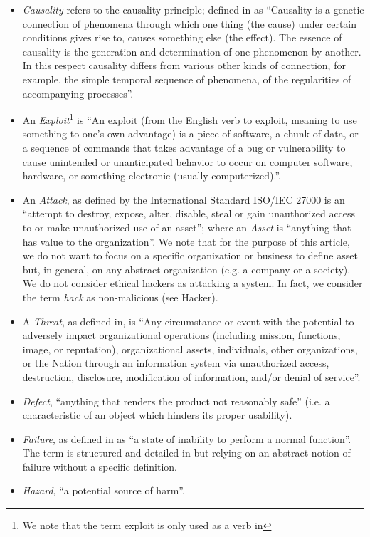 \begin{itemize}
	\item \emph{Causality} refers to the causality principle; defined
		in\autocite{Spirkin1983Dialectical} as ``Causality is a genetic
		connection of phenomena through which one thing (the cause)
		under certain conditions gives rise to, causes something else
		(the effect). The essence of causality is the generation and
		determination of one phenomenon by another. In this respect
		causality differs from various other kinds of connection, for
		example, the simple temporal sequence of phenomena, of the
		regularities of accompanying processes''.
	\item An \emph{Exploit}\footnote{We note that the term exploit is only
		used as a verb in\autocite{ISO2009information}} is ``An exploit
		(from the English verb to exploit, meaning to use something to
		one’s own advantage) is a piece of software, a chunk of data,
		or a sequence of commands that takes advantage of a bug or
		vulnerability to cause unintended or unanticipated behavior to
		occur on computer software, hardware, or something electronic
		(usually computerized).''\autocite{wiki-exploit}.
	\item An \emph{Attack}, as defined by the International Standard
		ISO/IEC 27000 is an ``attempt to destroy, expose, alter,
		disable, steal or gain unauthorized access to or make
		unauthorized use of an asset''; where an \emph{Asset} is
		``anything that has value to the organization''. We note that for
		the purpose of this article, we do not want to focus on a specific
		organization or business to define asset but, in general, on any 
		abstract organization (e.g. a company or a society).
		We do not consider ethical hackers as attacking a system. 
		In fact, we consider the term \emph{hack} as
		non-malicious (see Hacker\autocite{Stallman2002hacker}).
	\item A \emph{Threat}, as defined in\autocite{cnssi20104009}, is ``Any
		circumstance or event with the potential to adversely impact
		organizational operations (including mission, functions, image,
		or reputation), organizational assets, individuals, other
		organizations, or the Nation through an information system via
		unauthorized access, destruction, disclosure, modification of
		information, and/or denial of service''.
	\item \emph{Defect}, ``anything that renders the product not reasonably
		safe''\autocite{Robinson2019writing} (i.e. a characteristic of
		an object which hinders its proper usability).
	\item \emph{Failure}, as defined in\autocite{Merriam2020failure} as ``a state of
		inability to perform a normal function''. The term is
		structured and detailed in
		\autocite{cnssi20104009,iet2017glossary} but relying on an
		abstract notion of failure without a specific definition.
	\item \emph{Hazard}, ``a potential source of
		harm''\autocite{iet2017glossary}.
\end{itemize}
